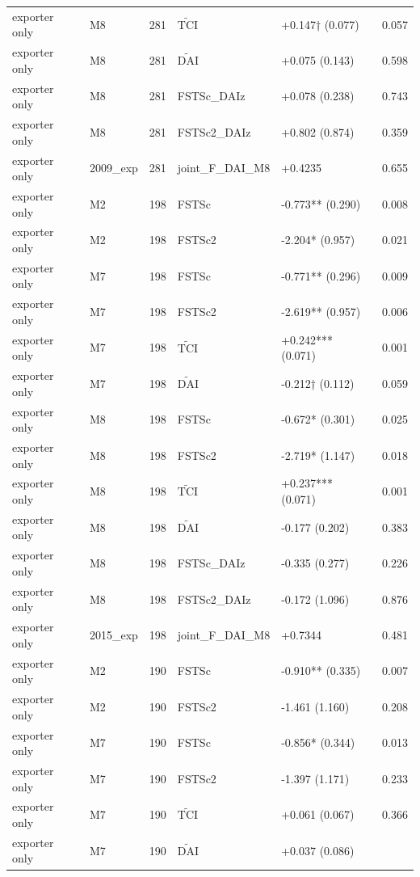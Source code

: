 \documentclass[12pt,a4paper]{article}
\begin{document}
\begin{longtable}[]{@{}llllll@{}}
exporter only & M8 & 281 & \(\tilde{\mathrm{TCI}}\) & +0.147† (0.077) &
0.057 \\
exporter only & M8 & 281 & \(\tilde{\mathrm{DAI}}\) & +0.075 (0.143) &
0.598 \\
exporter only & M8 & 281 & FSTSc\_DAIz & +0.078 (0.238) & 0.743 \\
exporter only & M8 & 281 & FSTSc2\_DAIz & +0.802 (0.874) & 0.359 \\
exporter only & 2009\_exp & 281 & joint\_F\_DAI\_M8 & +0.4235 & 0.655 \\
exporter only & M2 & 198 & FSTSc & -0.773** (0.290) & 0.008 \\
exporter only & M2 & 198 & FSTSc2 & -2.204* (0.957) & 0.021 \\
exporter only & M7 & 198 & FSTSc & -0.771** (0.296) & 0.009 \\
exporter only & M7 & 198 & FSTSc2 & -2.619** (0.957) & 0.006 \\
exporter only & M7 & 198 & \(\tilde{\mathrm{TCI}}\) & +0.242*** (0.071)
& 0.001 \\
exporter only & M7 & 198 & \(\tilde{\mathrm{DAI}}\) & -0.212† (0.112) &
0.059 \\
exporter only & M8 & 198 & FSTSc & -0.672* (0.301) & 0.025 \\
exporter only & M8 & 198 & FSTSc2 & -2.719* (1.147) & 0.018 \\
exporter only & M8 & 198 & \(\tilde{\mathrm{TCI}}\) & +0.237*** (0.071)
& 0.001 \\
exporter only & M8 & 198 & \(\tilde{\mathrm{DAI}}\) & -0.177 (0.202) &
0.383 \\
exporter only & M8 & 198 & FSTSc\_DAIz & -0.335 (0.277) & 0.226 \\
exporter only & M8 & 198 & FSTSc2\_DAIz & -0.172 (1.096) & 0.876 \\
exporter only & 2015\_exp & 198 & joint\_F\_DAI\_M8 & +0.7344 & 0.481 \\
exporter only & M2 & 190 & FSTSc & -0.910** (0.335) & 0.007 \\
exporter only & M2 & 190 & FSTSc2 & -1.461 (1.160) & 0.208 \\
exporter only & M7 & 190 & FSTSc & -0.856* (0.344) & 0.013 \\
exporter only & M7 & 190 & FSTSc2 & -1.397 (1.171) & 0.233 \\
exporter only & M7 & 190 & \(\tilde{\mathrm{TCI}}\) & +0.061 (0.067) &
0.366 \\
exporter only & M7 & 190 & \(\tilde{\mathrm{DAI}}\) & +0.037 (0.086) &

\end{longtable}
\end{document}
